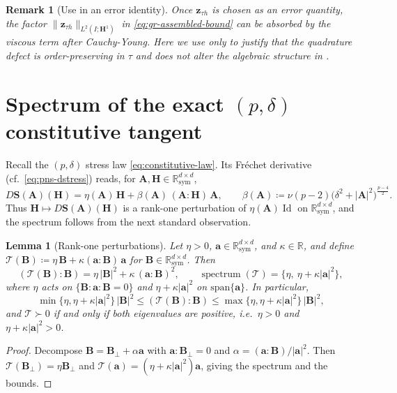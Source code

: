\documentclass[DIV=16]{scrartcl}
\newtheorem{lemma}[theorem]{Lemma}
\newtheorem{remark}[theorem]{Remark}
\DeclareMathOperator{\sym}{sym}
\DeclareMathOperator{\Id}{Id}
\newcommand{\abs}[1]{\left\lvert #1\right\rvert}
\renewcommand{\vv}{\boldsymbol z}
\newcommand{\Sstress}{\boldsymbol S} %
\newcommand{\It}{I}
\newcommand{\reg}{\delta}
\newcommand{\pn}{p}
\newcommand{\etaeff}[1]{\eta \left(#1\right)}
\newcommand{\DStress}[2]{D\Sstress \left(#1\right) \left(#2\right)}
\begin{document}
\begin{remark}[Use in an error identity]\label{rem:gr-absorb}
Once $\vv_{\tau h}$ is chosen as an error quantity, the factor
$\|\vv_{\tau h}\|_{L^2(\It;\boldsymbol H^1)}$ in \eqref{eq:gr-assembled-bound}
can be absorbed by the viscous term after Cauchy-Young. Here we use
 only to justify that the quadrature defect is order-preserving in $\tau$
and does not alter the algebraic structure in .
\end{remark}

\section{Spectrum of the exact \texorpdfstring{$(\pn,\reg)$}{(p,delta)} constitutive tangent}\label{app:tangent-spectrum}
Recall the $(\pn,\reg)$ stress law \eqref{eq:constitutive-law}. Its Fr\'echet derivative
(cf.\ \eqref{eq:pns-dstress}) reads, for $\bm A,\bm H\in\mathbb{R}^{d\times d}_{\sym}$,
\begin{equation}\label{eq:app_exact_tangent}
  \DStress{\bm A}{\bm H}
  =\etaeff{\bm A}\,\bm H
  +\beta(\bm A)\,(\bm A:\bm H)\,\bm A,
  \qquad
  \beta(\bm A)\coloneq \nu(\pn-2)\bigl(\reg^2+\abs{\bm A}^2\bigr)^{\frac{\pn-4}{2}}.
\end{equation}
Thus $\bm H\mapsto\DStress{\bm A}{\bm H}$ is a rank-one perturbation of
$\etaeff{\bm A}\Id$ on $\mathbb{R}^{d\times d}_{\sym}$, and the spectrum follows from
the next standard observation.

\begin{lemma}[Rank-one perturbations]\label{lem:rankone-tangent}
Let $\eta>0$, $\bm a\in\mathbb{R}^{d\times d}_{\sym}$, and $\kappa\in\mathbb{R}$, and define
$\mathcal T(\bm B)\coloneq \eta\,\bm B+\kappa(\bm a:\bm B)\,\bm a$ for $\bm B\in\mathbb{R}^{d\times d}_{\sym}$.
Then
\[
  (\mathcal T(\bm B):\bm B)=\eta\,\abs{\bm B}^2+\kappa\,(\bm a:\bm B)^2,
  \qquad
  \operatorname{spectrum}(\mathcal T)=\{\eta,\ \eta+\kappa\abs{\bm a}^2\},
\]
where $\eta$ acts on $\{\bm B:\bm a:\bm B=0\}$ and $\eta+\kappa\abs{\bm a}^2$ on $\mathrm{span}\{\bm a\}$.
In particular,
\[
  \min\{\eta,\eta+\kappa\abs{\bm a}^2\}\,\abs{\bm B}^2
  \le (\mathcal T(\bm B):\bm B)\le
  \max\{\eta,\eta+\kappa\abs{\bm a}^2\}\,\abs{\bm B}^2,
\]
and $\mathcal T\succ 0$ if and only if both eigenvalues are positive, i.e.\
$\eta>0$ and $\eta+\kappa\abs{\bm a}^2>0$.
\end{lemma}

\begin{proof}
Decompose $\bm B=\bm B_\perp+\alpha\bm a$ with $\bm a:\bm B_\perp=0$ and
$\alpha=(\bm a:\bm B)/\abs{\bm a}^2$.
Then $\mathcal T(\bm B_\perp)=\eta \bm B_\perp$ and
$\mathcal T(\bm a)=(\eta+\kappa\abs{\bm a}^2)\bm a$, giving the spectrum and the bounds.
\end{proof}
\end{document}
